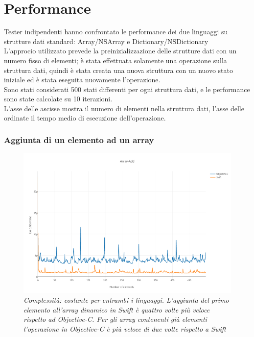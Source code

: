 \section{Performance}
Tester indipendenti hanno confrontato le performance dei due linguaggi su strutture dati standard: Array/NSArray e Dictionary/NSDictionary\\
L'approcio utilizzato prevede la preinizializzazione delle strutture dati con un numero fisso di elementi; è stata effettuata solamente una operazione sulla struttura dati, quindi è stata creata una nuova struttura con un nuovo stato iniziale ed è stata eseguita nuovamente l'operazione.\\ Sono stati considerati 500 stati differenti per ogni struttura dati, e le performance sono state calcolate su 10 iterazioni.\\L'asse delle ascisse mostra il numero di elementi nella struttura dati, l'asse delle ordinate il tempo medio di esecuzione dell'operazione.
\subsubsection{Aggiunta di un elemento ad un array}
\begin{figure}[H]
      \centering
      \includegraphics[scale=0.50]{immagini/array_add.png}
            \vspace{0.8cm}
            \caption{\textit{Complessità: costante per entrambi i linguaggi. L'aggiunta del primo elemento all'array dinamico in Swift è quattro volte più veloce rispetto ad Objective-C.
Per gli array contenenti già elementi l'operazione in Objective-C è più veloce di due volte rispetto a Swift}}
\end{figure}
